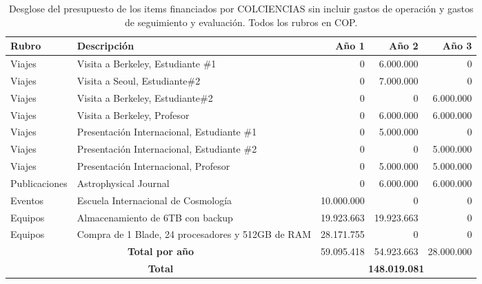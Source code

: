 \begin{table}[h]
\begin{center}
\begin{tabular}{|l|p{5.5cm}|r|r|r|}\hline
{\bf Rubro}	&{\bf Descripción}	& {\bf Año 1}	& {\bf Año 2}	& {\bf Año 3}\\\hline
Viajes	&Visita a Berkeley, Estudiante \#1	&0	&	6.000.000&0\\\hline
Viajes	&Visita a Seoul,  Estudiante\#2	&0	&7.000.000	&0\\\hline
Viajes	&Visita a Berkeley,  Estudiante\#2	&0	&0& 6.000.000 \\\hline
Viajes	&Visita a Berkeley, Profesor	&0	&6.000.000	&6.000.000\\\hline
Viajes	&Presentación Internacional, Estudiante \#1	&0	&5.000.000	&0\\\hline
Viajes	&Presentación Internacional, Estudiante \#2	&0	&0	&5.000.000\\\hline
Viajes	&Presentación Internacional, Profesor	&0	&5.000.000	&5.000.000\\\hline
Publicaciones	&Astrophysical Journal	&0	&6.000.000	&6.000.000\\\hline
Eventos	&Escuela Internacional de Cosmología	&10.000.000	&0	&0\\\hline
Equipos	&Almacenamiento de 6TB con backup 	&19.923.663	&19.923.663	&0\\\hline
Equipos	&Compra de 1 Blade, 24 procesadores y 512GB de RAM 	&28.171.755	&0	&0\\\hline
\multicolumn{2}{|c|}{{\bf Total por año}}	 & 59.095.418	&54.923.663	&28.000.000 \\\hline
\multicolumn{2}{|c|}{\bf Total } & \multicolumn{3}{|c|}{{\bf 148.019.081}}\\\hline
\end{tabular} 
\caption{Desglose del presupuesto de los items financiados por COLCIENCIAS sin incluir gastos de operaci\'on y gastos de seguimiento y evaluaci\'on. Todos los rubros en COP.}
\end{center}
\label{Resumen Presupuesto Colciencias}
\end{table}


